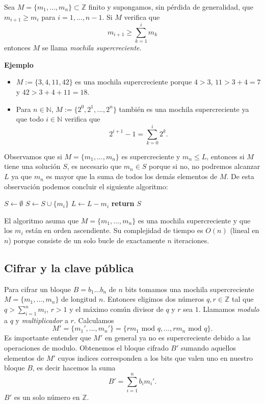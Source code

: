 \documentclass[12pt]{article}
\newcommand{\N}{\mathbb{N}}
\newcommand{\Z}{\mathbb{Z}}
\newenvironment{definition}[2][Definición]{\begin{trivlist}
\item[\hskip \labelsep {\bfseries #1}]}{\end{trivlist}}
\begin{document}
\begin{definition}{1}
Sea $M = \{m_1, ..., m_n\} \subset \Z$ finito y supongamos, sin pérdida de generalidad, que $m_{i+1} \geq m_i$ para $i = 1, ..., n-1$. Si $M$ verifica que
$$m_{i+1} \geq \sum_{k=1}^im_k$$
entonces $M$ se llama \emph{mochila supercreciente}.
\end{definition}
\textbf{Ejemplo}
\begin{itemize}
\item
$M := \{3, 4, 11, 42\}$ es una mochila supercreciente porque $4 > 3$, $11 > 3 + 4 = 7$ y $42 > 3 + 4 + 11 = 18$.

\item 
Para $n \in \N$, $M := \{2^0, 2^1, ..., 2^n\}$ también es una mochila supercreciente ya que todo $i \in \N$ verifica que
$$2^{i+1} - 1 = \sum_{k=0}^i2^k.$$
\end{itemize}
Observamos que si $M = \{m_1, ..., m_n\}$ es supercreciente y $m_n \leq L$, entonces si $M$ tiene una solución $S$, es necesario que $m_n \in S$ porque si no, no podremos alcanzar $L$ ya que $m_n$ es mayor que la suma de todos los demás elementos de $M$.
De esta observación podemos concluir el siguiente algoritmo:
\vspace{1em}
\begin{algorithmic}[1]
\State $S \gets \emptyset$
		\State $S \gets S \cup \{m_i\}$
		\State $L \gets L - m_i$
	\EndIf
\EndFor
\State \textbf{return} $S$
\EndProcedure
\end{algorithmic}
\vspace{1em}
El algoritmo asuma que $M = \{m_1,...,m_n\}$ es una mochila supercreciente y que los $m_i$ están en orden ascendiente. Su complejidad de tiempo es $O(n)$ (lineal en $n$) porque consiste de un solo bucle de exactamente $n$ iteraciones.

\subsection*{Cifrar y la clave pública}

Para cifrar un bloque $B = b_1...b_n$ de $n$ bits tomamos una mochila supercreciente $M = \{m_1, ..., m_n\}$ de longitud $n$. Entonces eligimos dos números $q, r \in \Z$ tal que $q > \sum_{i=1}^nm_i$, $r > 1$ y el máximo común divisor de $q$ y $r$ sea $1$. Llamamos \emph{modulo} a $q$ y \emph{multiplicador} a $r$. Calculamos
$$M' = \{m_1', ..., m_n'\} = \{r m_1 \text{ mod } q, ..., r m_n \text{ mod } q\}.$$
Es importante entender que $M'$ en general ya no es supercreciente debido a las operaciones de modulo. Obtenemos el bloque cifrado $B'$ sumando aquellos elementos de $M'$ cuyos indices corresponden a los bits que valen uno en nuestro bloque $B$, es decir hacemos la suma
$$B' = \sum_{i=1}^nb_im_i'.$$
$B'$ es un solo número en $\Z$.
\end{document}
